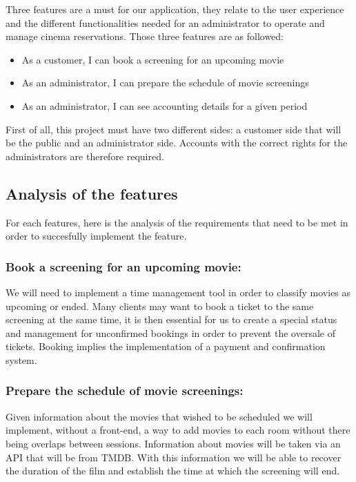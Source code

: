 \documentclass[
  french,
  11pt,
  a4paper,
]{article}
\providecommand{\tightlist}{%
  \setlength{\itemsep}{0pt}\setlength{\parskip}{0pt}}
\begin{document}
Three features are a must for our application, they relate to the user
experience and the different functionalities needed for an administrator
to operate and manage cinema reservations. Those three features are as
followed:

\begin{itemize}
\tightlist
\item
  As a customer, I can book a screening for an upcoming movie
\item
  As an administrator, I can prepare the schedule of movie screenings
\item
  As an administrator, I can see accounting details for a given period
\end{itemize}

First of all, this project must have two different sides: a customer
side that will be the public and an administrator side. Accounts with
the correct rights for the administrators are therefore required.

\subsection{Analysis of the features}\label{analysis-of-the-features}

For each features, here is the analysis of the requirements that need to
be met in order to succesfully implement the feature.

\subsubsection{Book a screening for an upcoming
movie:}\label{book-a-screening-for-an-upcoming-movie}

We will need to implement a time management tool in order to classify
movies as upcoming or ended. Many clients may want to book a ticket to
the same screening at the same time, it is then essential for us to
create a special status and management for unconfirmed bookings in order
to prevent the oversale of tickets. Booking implies the implementation
of a payment and confirmation system.

\subsubsection{Prepare the schedule of movie
screenings:}\label{prepare-the-schedule-of-movie-screenings}

Given information about the movies that wished to be scheduled we will
implement, without a front-end, a way to add movies to each room without
there being overlaps between sessions. Information about movies will be
taken via an API that will be from TMDB. With this information we will
be able to recover the duration of the film and establish the time at
which the screening will end.
\end{document}
